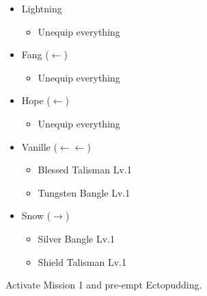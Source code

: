 \begin{menu}
\begin{itemize}
\begin{itemize}
		\end{itemize}
		\equip
		\begin{itemize}
			\item Lightning
				\begin{itemize}
					\item Unequip everything
				\end{itemize}
			\item Fang ($\leftarrow$)
				\begin{itemize}
					\item Unequip everything
				\end{itemize}
			\item Hope ($\leftarrow$)
				\begin{itemize}
					\item Unequip everything
				\end{itemize}
			\item Vanille ($\leftarrow\leftarrow$)
			      \begin{itemize}
				      \item Blessed Talisman Lv.1
				      \item Tungsten Bangle Lv.1
			      \end{itemize}
			\item Snow ($\rightarrow$)
			      \begin{itemize}
				      \item Silver Bangle Lv.1
				      \item Shield Talisman Lv.1
			      \end{itemize}
		\end{itemize}
	\end{itemize}
\end{menu}

Activate Mission 1 and pre-empt Ectopudding.

\renewcommand{\first}{[1] Solidarity (\com/\med/\sen)}
\renewcommand{\second}{[2] Delta Attack (\com/\rav/\sen)}
\renewcommand{\third}{[3] Bully (\syn/\sab/\com)}
\renewcommand{\fourth}{[4] Bully (\syn/\sab/\com)}
\renewcommand{\fifth}{[5] Devastation (\com/\sab/\com)}
\renewcommand{\sixth}{[6] Dirty Fighting (\com/\sab/\sen)}

